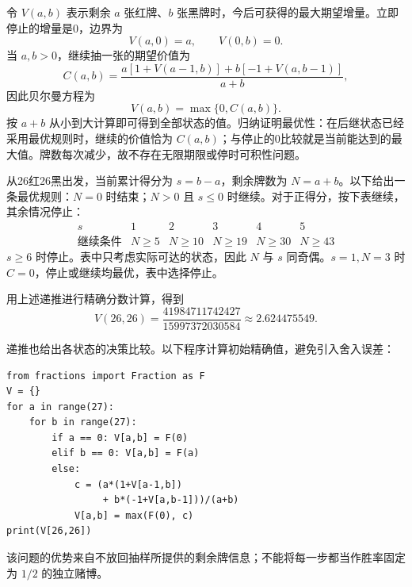 令 $V(a,b)$ 表示剩余 $a$ 张红牌、$b$ 张黑牌时，今后可获得的最大期望增量。立即停止的增量是0，边界为
\[
 V(a,0)=a,\qquad V(0,b)=0.
\]
当 $a,b>0$，继续抽一张的期望价值为
\[
 C(a,b)=\frac{a[1+V(a-1,b)]+b[-1+V(a,b-1)]}{a+b},
\]
因此贝尔曼方程为
\[
 \boxed{V(a,b)=\max\{0,C(a,b)\}}.
\]
按 $a+b$ 从小到大计算即可得到全部状态的值。归纳证明最优性：在后继状态已经采用最优规则时，继续的价值恰为 $C(a,b)$；与停止的0比较就是当前能达到的最大值。牌数每次减少，故不存在无限期限或停时可积性问题。

从26红26黑出发，当前累计得分为 $s=b-a$，剩余牌数为 $N=a+b$。以下给出一条最优规则：$N=0$ 时结束；$N>0$ 且 $s\le0$ 时继续。对于正得分，按下表继续，其余情况停止：
\[
 \begin{array}{c|ccccc}
 s&1&2&3&4&5\\\hline
 \text{继续条件}&N\ge5&N\ge10&N\ge19&N\ge30&N\ge43
 \end{array}
\]
$s\ge6$ 时停止。表中只考虑实际可达的状态，因此 $N$ 与 $s$ 同奇偶。$s=1,N=3$ 时 $C=0$，停止或继续均最优，表中选择停止。

用上述递推进行精确分数计算，得到
\[
 \boxed{V(26,26)=\frac{41984711742427}{15997372030584}
       \approx2.624475549}.
\]
\par\smallskip\noindent\begin{minipage}{\linewidth}
递推也给出各状态的决策比较。以下程序计算初始精确值，避免引入舍入误差：
\begin{verbatim}
from fractions import Fraction as F
V = {}
for a in range(27):
    for b in range(27):
        if a == 0: V[a,b] = F(0)
        elif b == 0: V[a,b] = F(a)
        else:
            c = (a*(1+V[a-1,b])
                 + b*(-1+V[a,b-1]))/(a+b)
            V[a,b] = max(F(0), c)
print(V[26,26])
\end{verbatim}
\end{minipage}\par\smallskip
该问题的优势来自不放回抽样所提供的剩余牌信息；不能将每一步都当作胜率固定为 $1/2$ 的独立赌博。
